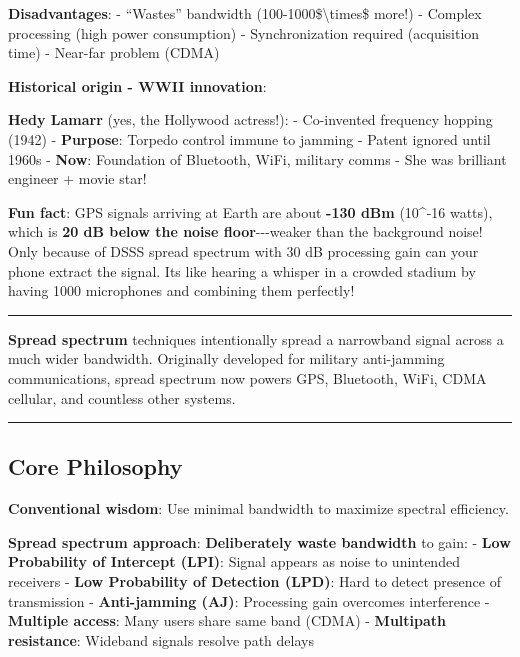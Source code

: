 \textbf{Disadvantages}: - ``Wastes'' bandwidth
(100-1000\$\textbackslash times\$ more!) - Complex processing (high
power consumption) - Synchronization required (acquisition time) -
Near-far problem (CDMA)

\textbf{Historical origin - WWII innovation}:

\textbf{Hedy Lamarr} (yes, the Hollywood actress!): - Co-invented
frequency hopping (1942) - \textbf{Purpose}: Torpedo control immune to
jamming - Patent ignored until 1960s - \textbf{Now}: Foundation of
Bluetooth, WiFi, military comms - She was brilliant engineer + movie
star!

\textbf{Fun fact}: GPS signals arriving at Earth are about \textbf{-130
dBm} (10\^{}-16 watts), which is \textbf{20 dB below the noise
floor}-\/-\/-weaker than the background noise! Only because of DSSS
spread spectrum with 30 dB processing gain can your phone extract the
signal. It\textquotesingle s like hearing a whisper in a crowded stadium
by having 1000 microphones and combining them perfectly!

\begin{center}\rule{0.5\linewidth}{0.5pt}\end{center}

\textbf{Spread spectrum} techniques intentionally spread a narrowband
signal across a much wider bandwidth. Originally developed for military
anti-jamming communications, spread spectrum now powers GPS, Bluetooth,
WiFi, CDMA cellular, and countless other systems.

\begin{center}\rule{0.5\linewidth}{0.5pt}\end{center}

\subsection{\texorpdfstring{ Core
Philosophy}{ Core Philosophy}}\label{core-philosophy}

\textbf{Conventional wisdom}: Use minimal bandwidth to maximize spectral
efficiency.

\textbf{Spread spectrum approach}: \textbf{Deliberately waste bandwidth}
to gain: - \textbf{Low Probability of Intercept (LPI)}: Signal appears
as noise to unintended receivers - \textbf{Low Probability of Detection
(LPD)}: Hard to detect presence of transmission - \textbf{Anti-jamming
(AJ)}: Processing gain overcomes interference - \textbf{Multiple
access}: Many users share same band (CDMA) - \textbf{Multipath
resistance}: Wideband signals resolve path delays

